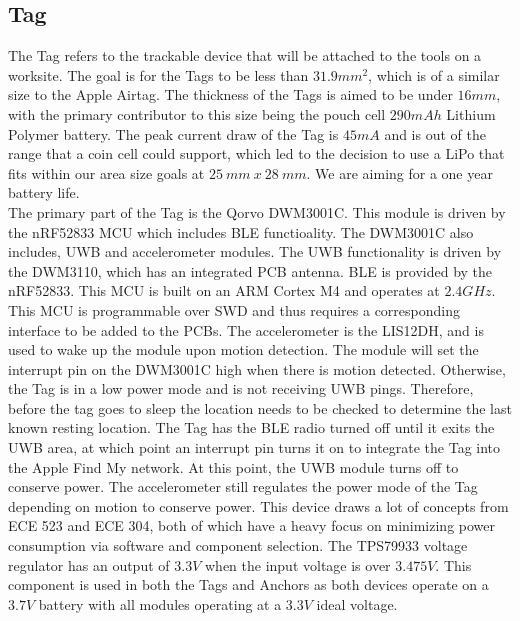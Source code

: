 \documentclass[conference]{IEEEtran}
\begin{document}
\subsection{Tag}\label{AA}
The Tag refers to the trackable device that will be attached to the tools 
on a worksite. The goal is for the Tags to be less than $31.9mm^2$, which is 
of a similar size to the Apple Airtag. The thickness of the Tags is aimed 
to be under $16mm$, with the primary contributor to this size being the 
pouch cell $290mAh$ Lithium Polymer battery. The peak current draw of the 
Tag is $45mA$ and is out of the range that a coin cell could support, 
which led to the decision to use a LiPo that fits within our area size 
goals at $25 \ mm \ x \ 28\ mm$. We are aiming for a one year battery life.
\\The primary part of the Tag is the Qorvo DWM3001C. This module is driven 
by the nRF52833 MCU which includes BLE functioality. The DWM3001C also includes, 
UWB and accelerometer modules. The UWB functionality is driven by the DWM3110,
which has an integrated PCB antenna. BLE is provided by the nRF52833. This MCU is built on an ARM Cortex 
M4 and operates at $2.4GHz$. This MCU is programmable over 
SWD and thus requires a corresponding interface to be added to the PCBs. 
The accelerometer is the LIS12DH, and is used to wake up the module 
upon motion detection. The module will set the interrupt pin on the 
DWM3001C high when there is motion detected. Otherwise, the Tag is in a 
low power mode and is not receiving UWB pings. 
Therefore, before the tag goes to sleep the location needs to be checked 
to determine the last known resting location. The Tag has the BLE radio turned off 
until it exits the UWB area, at which point an interrupt pin turns 
it on to integrate the Tag into the Apple Find My network. At this point, the 
UWB module turns off to conserve power. The accelerometer still regulates 
the power mode of the Tag depending on motion to conserve power. This
device draws a lot of concepts from ECE 523 and ECE 304, both of which 
have a heavy focus on minimizing power consumption via software and 
component selection. The TPS79933 voltage regulator has an output of 
$3.3V$ when the input voltage is over $3.475V$. This component is used in 
both the Tags and Anchors as both devices operate on a $3.7V$ battery 
with all modules operating at a $3.3V$ ideal voltage. 
\end{document}
